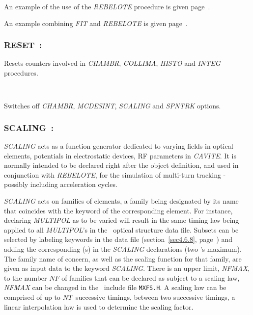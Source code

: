 \bigskip

 An example of the use of the \textsl{REBELOTE} procedure is given page~\pageref{ExaREBELOTE}. 

\bigskip

 An example combining \textsl{FIT} and \textsl{REBELOTE} is given page~\pageref{ExaFITREBELOTE}. 




\newpage

\subsubsection*{RESET~: \textbf{\RESETTitl} } \label{RESET} 
\medskip 

 \noindent Resets counters involved  in \textsl{CHAMBR}, \textsl{COLLIMA},   
  \textsl{HISTO} and \textsl{INTEG} procedures. 
 
~

 \noindent Switches off \textsl{CHAMBR}, \textsl{MCDESINT}, \textsl{SCALING} and 
 \textsl{SPNTRK} options. 






 \newpage

\subsubsection*{SCALING~: \SCALINGTitl} \label{SCALING}  
\medskip 
{}

\textsl{SCALING} acts as a function generator dedicated to varying 
fields in optical elements, potentials in 
electrostatic devices, RF parameters in \textsl{CAVITE}. It is normally intended
to be declared right after the object definition, and used in conjunction 
with \textsl{REBELOTE}, for the simulation of multi-turn tracking 
- possibly including  acceleration   cycles.  

\bigskip

\noindent\textsl{SCALING} acts on families of elements,  a family being
designated by its name that  coincides with 
the keyword of the corresponding element. For instance, declaring \textsl{MULTIPOL} 
as to be varied will result in the same timing law being applied to all 
\textsl{MULTIPOL}'s in the \zgou\ optical structure data file. Subsets can be selected by 
labeling keywords in the data file (section~\ref{sec4.6.8}, page~\pageref{sec4.6.8}) 
and adding the corresponding \LABEL(s) 
in the \textsl{SCALING} declarations (two \LABEL's maximum). The family name of concern, 
as well as the scaling function for  that  family,  are given as
input data to the keyword \textsl{SCALING}. There is an upper limit, \textsl{NFMAX}, to the number  $NF$ 
of families that can be declared
as subject to a scaling law,  \textsl{NFMAX} can be changed in the \FORTRAN\ include file \texttt{MXFS.H}. 
A scaling law can be comprised  of up to $NT$~successive timings,  
between two successive timings, a linear interpolation law is used to determine the scaling factor. 

